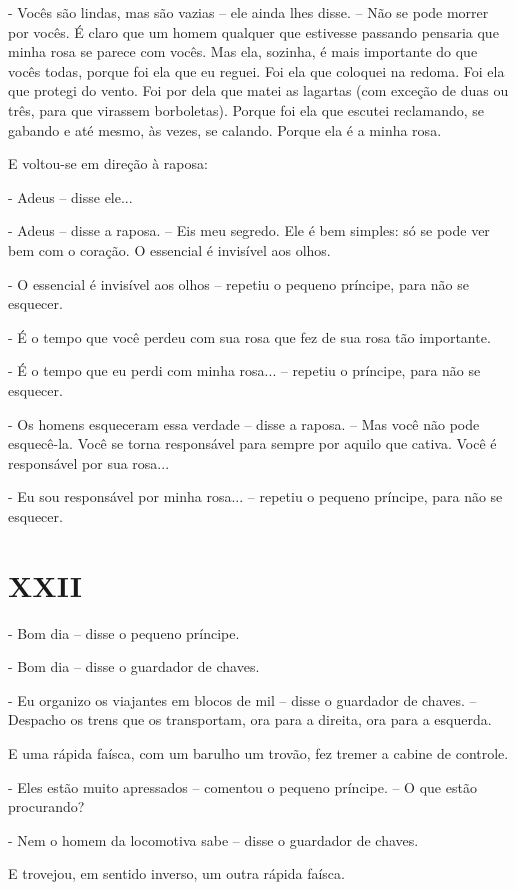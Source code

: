 - Vocês são lindas, mas são vazias -- ele ainda lhes disse. -- Não se
pode morrer por vocês. É claro que um homem qualquer que estivesse
passando pensaria que minha rosa se parece com vocês. Mas ela, sozinha,
é mais importante do que vocês todas, porque foi ela que eu reguei. Foi
ela que coloquei na redoma. Foi ela que protegi do vento. Foi por dela
que matei as lagartas (com exceção de duas ou três, para que virassem
borboletas). Porque foi ela que escutei reclamando, se gabando e até
mesmo, às vezes, se calando. Porque ela é a minha rosa.

E voltou-se em direção à raposa:

- Adeus -- disse ele...

- Adeus -- disse a raposa. -- Eis meu segredo. Ele é bem simples: só se
pode ver bem com o coração. O essencial é invisível aos olhos.

- O essencial é invisível aos olhos -- repetiu o pequeno príncipe, para
não se esquecer.

- É o tempo que você perdeu com sua rosa que fez de sua rosa tão
importante.

- É o tempo que eu perdi com minha rosa... -- repetiu o príncipe, para
não se esquecer.

- Os homens esqueceram essa verdade -- disse a raposa. -- Mas você não
pode esquecê-la. Você se torna responsável para sempre por aquilo que
cativa. Você é responsável por sua rosa...

- Eu sou responsável por minha rosa... -- repetiu o pequeno príncipe,
para não se esquecer.

\chapter{XXII}

- Bom dia -- disse o pequeno príncipe.

- Bom dia -- disse o guardador de chaves.

- Eu organizo os viajantes em blocos de mil -- disse o guardador de
chaves. -- Despacho os trens que os transportam, ora para a direita, ora
para a esquerda.

E uma rápida faísca, com um barulho um trovão, fez tremer a cabine de
controle.

- Eles estão muito apressados -- comentou o pequeno príncipe. -- O que
estão procurando?

- Nem o homem da locomotiva sabe -- disse o guardador de chaves.

E trovejou, em sentido inverso, um outra rápida faísca.

